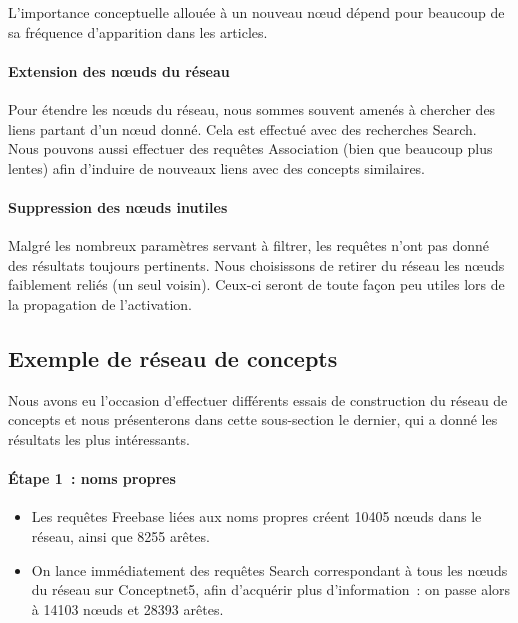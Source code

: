 \documentclass[a4paper, 12pt]{article}
\begin{document}
L'importance conceptuelle allouée à un nouveau n\oe{}ud dépend pour beaucoup de sa fréquence d'apparition dans les articles.


\paragraph{Extension des nœuds du réseau}

Pour étendre les n\oe{}uds du réseau, nous sommes souvent amenés à chercher des liens partant d'un n\oe{}ud donné. Cela est effectué avec des recherches Search. Nous pouvons aussi effectuer des requêtes Association (bien que beaucoup plus lentes) afin d'induire de nouveaux liens avec des concepts similaires.



\paragraph{Suppression des nœuds inutiles}
Malgré les nombreux paramètres servant à filtrer, les requêtes n'ont pas donné des résultats toujours pertinents. Nous choisissons de retirer du réseau les nœuds faiblement reliés (un seul voisin). Ceux-ci seront de toute fa\c{c}on peu utiles lors de la propagation de l'activation.


\subsection{Exemple de réseau de concepts}

Nous avons eu l'occasion d'effectuer différents essais de construction du réseau de concepts et nous présenterons dans cette sous-section le dernier, qui a donné les résultats les plus intéressants.

\paragraph{Étape 1~: noms propres}

\begin{itemize}
 \item Les requêtes Freebase liées aux noms propres créent 10405 n\oe{}uds dans le réseau, ainsi que 8255 arêtes.
 \item On lance immédiatement des requêtes Search correspondant à tous les n\oe{}uds du réseau sur Conceptnet5, afin d'acquérir plus d'information~: on passe alors à 14103 n\oe{}uds et 28393 arêtes.
\end{itemize}
\end{document}
